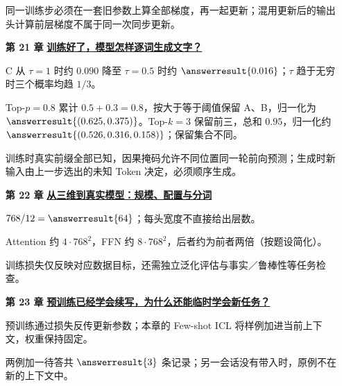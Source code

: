 \begin{enumerate}[leftmargin=5.4em,labelsep=.7em,itemsep=9pt]
\par{}同一训练步必须在一套旧参数上算全部梯度，再一起更新；混用更新后的输出头计算前层梯度不属于同一次同步更新。
\par{}
\item[\textbf{第 21 章}] \label{answer:23-llm-systems}\textbf{\hyperref[check:23-llm-systems]{训练好了，模型怎样逐词生成文字？}}\par\nobreak
 C 从 $\tau=1$ 时约 $0.090$ 降至 $\tau=0.5$ 时约 $\answerresult{0.016}$；$\tau$ 趋于无穷时三个概率均趋 $1/3$。
\par{}Top-$p=0.8$ 累计 $0.5+0.3=0.8$，按大于等于阈值保留 A、B，归一化为 $\answerresult{(0.625,0.375)}$。Top-$k=3$ 保留前三，总和 $0.95$，归一化约 $\answerresult{(0.526,0.316,0.158)}$；保留集合不同。
\par{}训练时真实前缀全部已知，因果掩码允许不同位置同一轮前向预测；生成时新输入由上一步选出的未知 Token 决定，必须顺序生成。
\par{}
\item[\textbf{第 22 章}] \label{answer:23a-from-toy-to-gpt}\textbf{\hyperref[check:23a-from-toy-to-gpt]{从三维到真实模型：规模、配置与分词}}\par\nobreak
{}$768/12=\answerresult{64}$；每头宽度不直接给出层数。
\par{}Attention 约 $4\cdot768^2$，FFN 约 $8\cdot768^2$，后者约为前者两倍（按题设简化）。
\par{}训练损失仅反映对应数据目标，还需独立泛化评估与事实／鲁棒性等任务检查。
\par{}
\item[\textbf{第 23 章}] \label{answer:23aa-pretraining-icl}\textbf{\hyperref[check:23aa-pretraining-icl]{预训练已经学会续写，为什么还能临时学会新任务？}}\par\nobreak
{}预训练通过损失反传更新参数；本章的 Few-shot ICL 将样例加进当前上下文，权重保持固定。
\par{}两例加一待答共 $\answerresult{3}$ 条记录；另一会话没有带入时，原例不在新的上下文中。

\end{enumerate}
